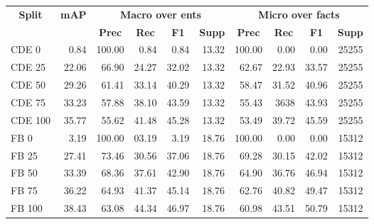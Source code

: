 \begin{tabular}{| l | r | r | r | r | r | r | r | r | r |}
    \hline
    
    \multicolumn{1}{|c|}{\textbf{Split}} &
    \multicolumn{1}{|c|}{\textbf{mAP}} &
    \multicolumn{4}{|c|}{\textbf{Macro over ents}} &
    \multicolumn{4}{|c|}{\textbf{Micro over facts}} \\
    
    \multicolumn{1}{|c|}{} &
    \multicolumn{1}{|c|}{} &
    \multicolumn{1}{|c|}{\textbf{Prec}} &
    \multicolumn{1}{|c|}{\textbf{Rec}} &
    \multicolumn{1}{|c|}{\textbf{F1}} &
    \multicolumn{1}{|c|}{\textbf{Supp}} &
    \multicolumn{1}{|c|}{\textbf{Prec}} &
    \multicolumn{1}{|c|}{\textbf{Rec}} &
    \multicolumn{1}{|c|}{\textbf{F1}} &
    \multicolumn{1}{|c|}{\textbf{Supp}} \\
    
    \hline \hline
    
    CDE 0 & 0.84 &
    100.00 & 0.84 & 0.84 & \num{13.32} &
    100.00 & 0.00 & 0.00 & \num{25255} \\
    
    CDE 25 & 22.06 &
    66.90 & 24.27 & 32.02 & \num{13.32} &
    62.67 & 22.93 & 33.57 & \num{25255} \\
    
    CDE 50 & 29.26 &
    61.41 & 33.14 & 40.29 & \num{13.32} &
    58.47 & 31.52 & 40.96 & \num{25255} \\
    
    CDE 75 & 33.23 &
    57.88 & 38.10 & 43.59 & \num{13.32} &
    55.43 & 3638 & 43.93 & \num{25255} \\
    
    CDE 100 & 35.77 &
    55.62 & 41.48 & 45.28 & \num{13.32} &
    53.49 & 39.72 & 45.59 & \num{25255} \\
    
    \hline
    
    FB 0 & 3.19 &
    100.00 & 03.19 & 3.19 & \num{18.76} &
    100.00 & 0.00 & 0.00 & \num{15312} \\
    
    FB 25 & 27.41 &
    73.46 & 30.56 & 37.06 & \num{18.76} &
    69.28 & 30.15 & 42.02 & \num{15312} \\
    
    FB 50 & 33.39 &
    68.36 & 37.61 & 42.90 & \num{18.76} &
    64.90 & 36.76 & 46.94 & \num{15312} \\
    
    FB 75 & 36.22 &
    64.93 & 41.37 & 45.14 & \num{18.76} &
    62.76 & 40.82 & 49.47 & \num{15312} \\
    
    FB 100 & 38.43 &
    63.08 & 44.34 & 46.97 & \num{18.76} &
    60.98 & 43.51 & 50.79 & \num{15312} \\
    
    \hline
\end{tabular}
